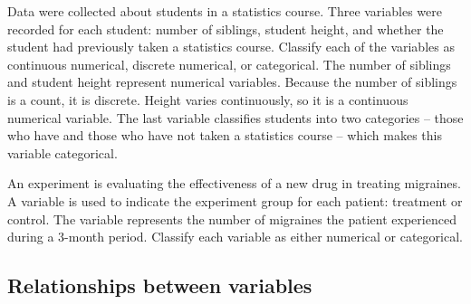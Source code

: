\begin{examplewrap}
\begin{nexample}{Data were collected about students
    in a statistics course.
    Three variables were recorded for each student:
    number of siblings, student height, and whether
    the student had previously taken a statistics course.
    Classify each of the variables as continuous numerical,
    discrete numerical, or categorical.}
  The number of siblings and student height represent
  numerical variables.
  Because the number of siblings is a count, it is discrete.
  Height varies continuously, so it is a continuous numerical
  variable.
  The last variable classifies students into two categories
  -- those who have and those who have not taken a statistics
  course -- which makes this variable categorical.
\end{nexample}
\end{examplewrap}

\begin{exercisewrap}
\begin{nexercise}%
An experiment is evaluating the effectiveness of a new drug
in treating migraines.
A  variable is used to indicate the experiment group
for each patient: treatment or control.
The \mbox{} variable represents the number
of migraines the patient experienced during a 3-month period.
\mbox{Classify} each variable as either numerical or
categorical.\footnotemark
\end{nexercise}
\end{exercisewrap}


\D{\newpage}

\subsection{Relationships between variables}
\label{variableRelations}

